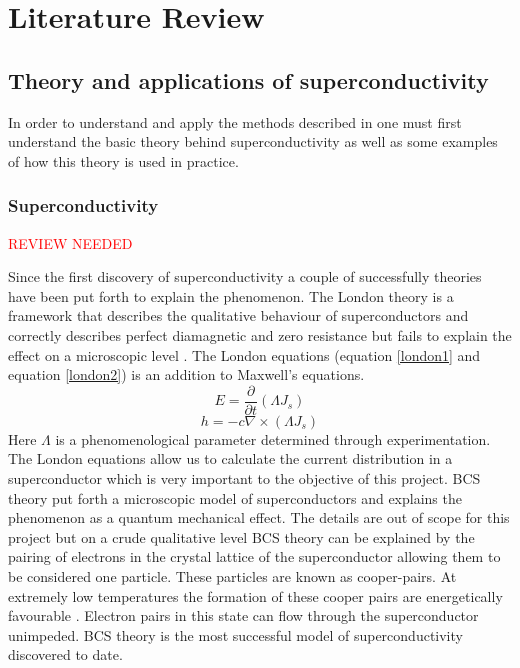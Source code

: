 \graphicspath{{litreview/fig/}}

\chapter{Literature Review}
\label{chap:litreview}


\section{Theory and applications of superconductivity}
In order to understand and apply the methods described in \cite{fluxNoiseSquidsStevenAnton} one must first understand the basic theory behind superconductivity as well as some examples of how this theory is used in practice.

\subsection{Superconductivity}
\textcolor{red}{REVIEW NEEDED}

Since the first discovery of superconductivity a couple of successfully theories have been put forth to explain the phenomenon. The London theory is a framework that describes the qualitative behaviour of superconductors and correctly describes perfect diamagnetic and zero resistance but fails to explain the effect on a microscopic level \cite{Golubov_1998}. The London equations (equation \ref{london1} and equation \ref{london2}) \cite{Tinkham_2015} is an addition to Maxwell's equations.
\begin{equation}
    E = \frac{\partial}{\partial t}(\Lambda J_s)
    \label{london1}
\end{equation}
\begin{equation}
    h = -c \nabla\times (\Lambda J_s)
    \label{london2}
\end{equation}
Here $\Lambda$ is a phenomenological parameter determined through experimentation. The London equations allow us to calculate the current distribution in a superconductor which is very important to the objective of this project. BCS theory put forth a microscopic model of superconductors and explains the phenomenon as a quantum mechanical effect. The details are out of scope for this project but on a crude qualitative level BCS theory can be explained by the pairing of electrons in the crystal lattice of the superconductor allowing them to be considered one particle. These particles are known as cooper-pairs. At extremely low temperatures the formation of these cooper pairs are energetically favourable \cite{Feynman_Leighton_Sands_2013}. Electron pairs in this state can flow through the superconductor unimpeded. BCS theory is the most successful model of superconductivity discovered to date. 

